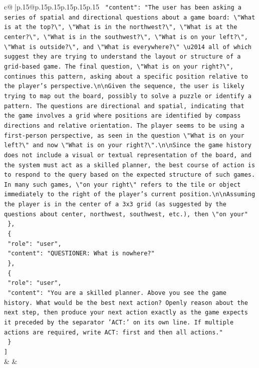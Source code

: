 \documentclass{article}
\begin{document}
{\begin{supertabular}{c@{$\;$}|p{.15\linewidth}@{}p{.15\linewidth}p{.15\linewidth}p{.15\linewidth}p{.15\linewidth}p{.15\linewidth}}
{{{\texttt{    "content": "The user has been asking a series of spatial and directional questions about a game board: \textbackslash{}"What is at the top?\textbackslash{}", \textbackslash{}"What is in the northwest?\textbackslash{}", \textbackslash{}"What is at the center?\textbackslash{}", \textbackslash{}"What is in the southwest?\textbackslash{}", \textbackslash{}"What is on your left?\textbackslash{}", \textbackslash{}"What is outside?\textbackslash{}", and \textbackslash{}"What is everywhere?\textbackslash{}" \textbackslash{}u2014 all of which suggest they are trying to understand the layout or structure of a grid{-}based game. The final question, \textbackslash{}"What is on your right?\textbackslash{}", continues this pattern, asking about a specific position relative to the player's perspective.\textbackslash{}n\textbackslash{}nGiven the sequence, the user is likely trying to map out the board, possibly to solve a puzzle or identify a pattern. The questions are directional and spatial, indicating that the game involves a grid where positions are identified by compass directions and relative orientation. The player seems to be using a first{-}person perspective, as seen in the question \textbackslash{}"What is on your left?\textbackslash{}" and now \textbackslash{}"What is on your right?\textbackslash{}".\textbackslash{}n\textbackslash{}nSince the game history does not include a visual or textual representation of the board, and the system must act as a skilled planner, the best course of action is to respond to the query based on the expected structure of such games. In many such games, \textbackslash{}"on your right\textbackslash{}" refers to the tile or object immediately to the right of the player's current position.\textbackslash{}n\textbackslash{}nAssuming the player is in the center of a 3x3 grid (as suggested by the questions about center, northwest, southwest, etc.), then \textbackslash{}"on your"} \\
\texttt{  \},} \\
\texttt{  \{} \\
\texttt{    "role": "user",} \\
\texttt{    "content": "QUESTIONER: What is nowhere?"} \\
\texttt{  \},} \\
\texttt{  \{} \\
\texttt{    "role": "user",} \\
\texttt{    "content": "You are a skilled planner. Above you see the game history. What would be the best next action? Openly reason about the next step, then produce your next action exactly as the game expects it preceded by the separator 'ACT:' on its own line. If multiple actions are required, write ACT: first and then all actions."} \\
\texttt{  \}} \\
\texttt{{]}} \\
            }
        }
    }
    & & \\ \\


\end{supertabular}}
\end{document}
